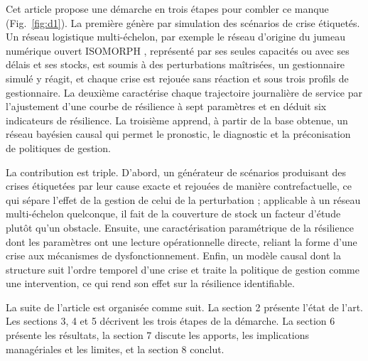 Cet article propose une démarche en trois étapes pour combler ce manque (Fig.~\ref{fig:d1}). La première génère par simulation des scénarios de crise étiquetés. Un réseau logistique multi-échelon, par exemple le réseau d'origine du jumeau numérique ouvert ISOMORPH \citep{zhang2026isomorph}, représenté par ses seules capacités ou avec ses délais et ses stocks, est soumis à des perturbations maîtrisées, un gestionnaire simulé y réagit, et chaque crise est rejouée sans réaction et sous trois profils de gestionnaire. La deuxième caractérise chaque trajectoire journalière de service par l'ajustement d'une courbe de résilience à sept paramètres et en déduit six indicateurs de résilience. La troisième apprend, à partir de la base obtenue, un réseau bayésien causal \citep{pearl2009} qui permet le pronostic, le diagnostic et la préconisation de politiques de gestion.

\begin{center}
\resizebox{\textwidth}{!}{}
\label{fig:d1}
\end{center}

La contribution est triple. D'abord, un générateur de scénarios produisant des crises étiquetées par leur cause exacte et rejouées de manière contrefactuelle, ce qui sépare l'effet de la gestion de celui de la perturbation ; applicable à un réseau multi-échelon quelconque, il fait de la couverture de stock un facteur d'étude plutôt qu'un obstacle. Ensuite, une caractérisation paramétrique de la résilience dont les paramètres ont une lecture opérationnelle directe, reliant la forme d'une crise aux mécanismes de dysfonctionnement. Enfin, un modèle causal dont la structure suit l'ordre temporel d'une crise et traite la politique de gestion comme une intervention, ce qui rend son effet sur la résilience identifiable.

La suite de l'article est organisée comme suit. La section 2 présente l'état de l'art. Les sections 3, 4 et 5 décrivent les trois étapes de la démarche. La section 6 présente les résultats, la section 7 discute les apports, les implications managériales et les limites, et la section 8 conclut.
